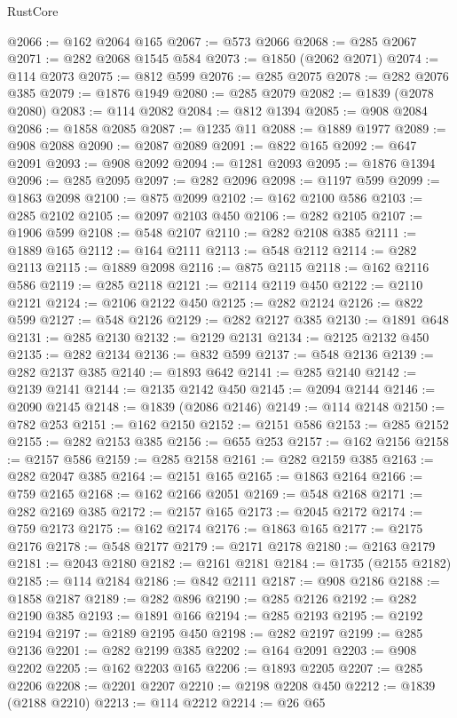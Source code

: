 \begin{lexlean}{RustCore}
\begin{coremodule}
@2066 := @162 @2064 @165
@2067 := @573 @2066
@2068 := @285 @2067
@2071 := @282 @2068 @1545 @584
@2073 := @1850 (@2062 @2071)
@2074 := @114 @2073
@2075 := @812 @599
@2076 := @285 @2075
@2078 := @282 @2076 @385
@2079 := @1876 @1949
@2080 := @285 @2079
@2082 := @1839 (@2078 @2080)
@2083 := @114 @2082
@2084 := @812 @1394
@2085 := @908 @2084
@2086 := @1858 @2085
@2087 := @1235 @11
@2088 := @1889 @1977
@2089 := @908 @2088
@2090 := @2087 @2089
@2091 := @822 @165
@2092 := @647 @2091
@2093 := @908 @2092
@2094 := @1281 @2093
@2095 := @1876 @1394
@2096 := @285 @2095
@2097 := @282 @2096
@2098 := @1197 @599
@2099 := @1863 @2098
@2100 := @875 @2099
@2102 := @162 @2100 @586
@2103 := @285 @2102
@2105 := @2097 @2103 @450
@2106 := @282 @2105
@2107 := @1906 @599
@2108 := @548 @2107
@2110 := @282 @2108 @385
@2111 := @1889 @165
@2112 := @164 @2111
@2113 := @548 @2112
@2114 := @282 @2113
@2115 := @1889 @2098
@2116 := @875 @2115
@2118 := @162 @2116 @586
@2119 := @285 @2118
@2121 := @2114 @2119 @450
@2122 := @2110 @2121
@2124 := @2106 @2122 @450
@2125 := @282 @2124
@2126 := @822 @599
@2127 := @548 @2126
@2129 := @282 @2127 @385
@2130 := @1891 @648
@2131 := @285 @2130
@2132 := @2129 @2131
@2134 := @2125 @2132 @450
@2135 := @282 @2134
@2136 := @832 @599
@2137 := @548 @2136
@2139 := @282 @2137 @385
@2140 := @1893 @642
@2141 := @285 @2140
@2142 := @2139 @2141
@2144 := @2135 @2142 @450
@2145 := @2094 @2144
@2146 := @2090 @2145
@2148 := @1839 (@2086 @2146)
@2149 := @114 @2148
@2150 := @782 @253
@2151 := @162 @2150
@2152 := @2151 @586
@2153 := @285 @2152
@2155 := @282 @2153 @385
@2156 := @655 @253
@2157 := @162 @2156
@2158 := @2157 @586
@2159 := @285 @2158
@2161 := @282 @2159 @385
@2163 := @282 @2047 @385
@2164 := @2151 @165
@2165 := @1863 @2164
@2166 := @759 @2165
@2168 := @162 @2166 @2051
@2169 := @548 @2168
@2171 := @282 @2169 @385
@2172 := @2157 @165
@2173 := @2045 @2172
@2174 := @759 @2173
@2175 := @162 @2174
@2176 := @1863 @165
@2177 := @2175 @2176
@2178 := @548 @2177
@2179 := @2171 @2178
@2180 := @2163 @2179
@2181 := @2043 @2180
@2182 := @2161 @2181
@2184 := @1735 (@2155 @2182)
@2185 := @114 @2184
@2186 := @842 @2111
@2187 := @908 @2186
@2188 := @1858 @2187
@2189 := @282 @896
@2190 := @285 @2126
@2192 := @282 @2190 @385
@2193 := @1891 @166
@2194 := @285 @2193
@2195 := @2192 @2194
@2197 := @2189 @2195 @450
@2198 := @282 @2197
@2199 := @285 @2136
@2201 := @282 @2199 @385
@2202 := @164 @2091
@2203 := @908 @2202
@2205 := @162 @2203 @165
@2206 := @1893 @2205
@2207 := @285 @2206
@2208 := @2201 @2207
@2210 := @2198 @2208 @450
@2212 := @1839 (@2188 @2210)
@2213 := @114 @2212
@2214 := @26 @65

\end{coremodule}
\end{lexlean}
